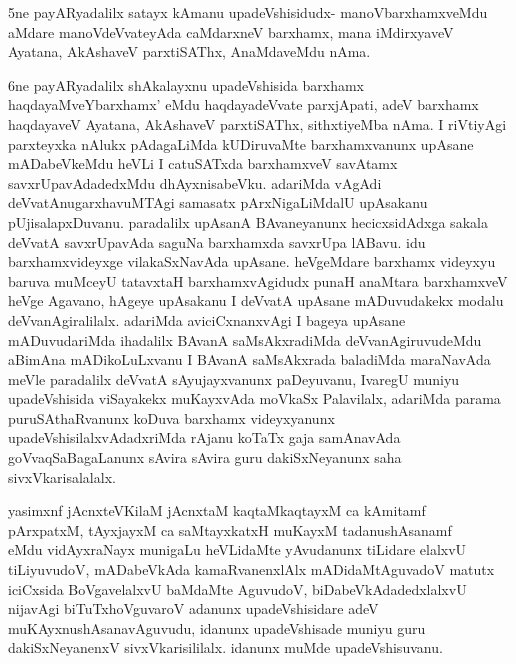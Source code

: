\begin{artha}
5ne payARyadalilx satayx kAmanu upadeVshisidudx- manoVbarxhamxveMdu aMdare manoVdeVvateyAda caMdarxneV barxhamx, mana iMdirxyaveV Ayatana, AkAshaveV parxtiSAThx, AnaMdaveMdu nAma. 
\end{artha}

\begin{artha}
6ne payARyadalilx shAkalayxnu upadeVshisida barxhamx haqdayaMveYbarxhamx' eMdu haqdayadeVvate parxjApati, adeV barxhamx haqdayaveV Ayatana, AkAshaveV parxtiSAThx, sithxtiyeMba nAma. I riVtiyAgi parxteyxka nAlukx pAdagaLiMda kUDiruvaMte barxhamxvanunx upAsane mADabeVkeMdu heVLi I catuSATxda barxhamxveV savAtamx savxrUpavAdadedxMdu dhAyxnisabeVku. adariMda vAgAdi deVvatAnugarxhavuMTAgi samasatx pArxNigaLiMdalU upAsakanu pUjisalapxDuvanu. paradalilx upAsanA BAvaneyanunx hecicxsidAdxga sakala deVvatA savxrUpavAda saguNa barxhamxda savxrUpa lABavu. idu barxhamxvideyxge vilakaSxNavAda upAsane. heVgeMdare barxhamx videyxyu baruva muMceyU tatavxtaH barxhamxvAgidudx punaH anaMtara barxhamxveV heVge Agavano, hAgeye upAsakanu I deVvatA upAsane mADuvudakekx modalu deVvanAgiralilalx. adariMda aviciCxnanxvAgi I bageya upAsane mADuvudariMda ihadalilx BAvanA saMsAkxradiMda deVvanAgiruvudeMdu aBimAna mADikoLuLxvanu I BAvanA saMsAkxrada baladiMda maraNavAda meVle paradalilx deVvatA sAyujayxvanunx paDeyuvanu, IvaregU muniyu upadeVshisida viSayakekx muKayxvAda moVkaSx Palavilalx, adariMda parama puruSAthaRvanunx koDuva barxhamx videyxyanunx upadeVshisilalxvAdadxriMda rAjanu koTaTx gaja samAnavAda goVvaqSaBagaLanunx sAvira sAvira guru dakiSxNeyanunx saha sivxVkarisalalalx. 
\end{artha}%


\begin{artha}
yasimxnf jAcnxteV\s KilaM jAcnxtaM kaqtaMkaqtayxM ca kAmitamf \\
pArxpatxM, tAyxjayxM ca saMtayxkatxH muKayxM tadanushAsanamf \\ 

eMdu vidAyxraNayx munigaLu heVLidaMte yAvudanunx tiLidare elalxvU tiLiyuvudoV, mADabeVkAda kamaRvanenxlAlx mADidaMtAguvadoV matutx iciCxsida BoVgavelalxvU baMdaMte AguvudoV, biDabeVkAdadedxlalxvU nijavAgi biTuTxhoVguvaroV adanunx upadeVshisidare adeV muKAyxnushAsanavAguvudu, idanunx upadeVshisade muniyu guru dakiSxNeyanenxV sivxVkarisililalx. idanunx muMde upadeVshisuvanu. 
\end{artha}

